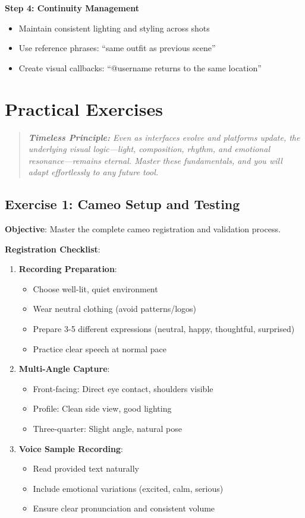 \textbf{Step 4: Continuity Management}
\begin{itemize}
\item Maintain consistent lighting and styling across shots
\item Use reference phrases: ``same outfit as previous scene''
\item Create visual callbacks: ``@username returns to the same location''
\end{itemize}

\section*{Practical Exercises}

\begin{quote}
\textit{\textbf{Timeless Principle:} Even as interfaces evolve and platforms update, the underlying visual logic---light, composition, rhythm, and emotional resonance---remains eternal. Master these fundamentals, and you will adapt effortlessly to any future tool.}
\end{quote}

\subsection*{Exercise 1: Cameo Setup and Testing}
\textbf{Objective}: Master the complete cameo registration and validation process.

\textbf{Registration Checklist}:
\begin{enumerate}
\item \textbf{Recording Preparation}:
   \begin{itemize}
   \item Choose well-lit, quiet environment
   \item Wear neutral clothing (avoid patterns/logos)
   \item Prepare 3-5 different expressions (neutral, happy, thoughtful, surprised)
   \item Practice clear speech at normal pace
   \end{itemize}
\item \textbf{Multi-Angle Capture}:
   \begin{itemize}
   \item Front-facing: Direct eye contact, shoulders visible
   \item Profile: Clean side view, good lighting
   \item Three-quarter: Slight angle, natural pose
   \end{itemize}
\item \textbf{Voice Sample Recording}:
   \begin{itemize}
   \item Read provided text naturally
   \item Include emotional variations (excited, calm, serious)
   \item Ensure clear pronunciation and consistent volume
   \end{itemize}
\end{enumerate}

